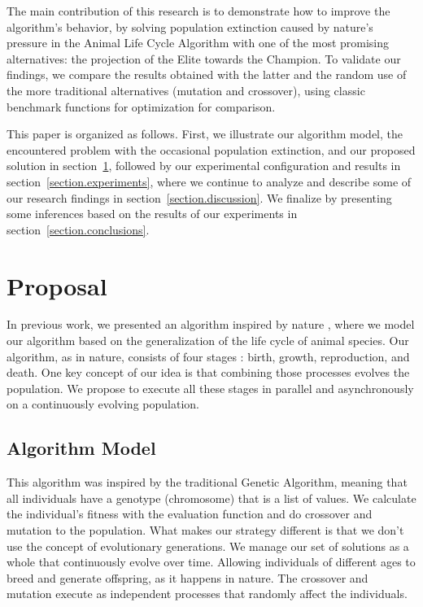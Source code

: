 \documentclass[graybox]{svmult}
\begin{document}
    The main contribution of this research is to demonstrate how to improve the
    algorithm's behavior, by solving population extinction caused by nature's
    pressure in the Animal Life Cycle Algorithm with one of the most promising
    alternatives: the projection of the Elite towards the Champion. To validate
    our findings, we compare the results obtained with the latter and the
    random use of the more traditional alternatives (mutation and crossover),
    using classic benchmark functions for optimization for comparison.

    This paper is organized as follows. First, we 
    illustrate our algorithm model, the encountered problem with the occasional
    population extinction, and our proposed solution in
    section~\ref{section.proposal}, followed by our experimental configuration and
    results in section~\ref{section.experiments}, where we continue to analyze and
    describe some of our research findings in section~\ref{section.discussion}. We
    finalize by presenting some inferences based on the results of our experiments
    in section~\ref{section.conclusions}.

\section{Proposal}
    \label{section.proposal}

    In previous work, we presented an algorithm inspired by nature 
    \cite{Felix-Saul2022}, where we model our algorithm based on
    the generalization of the life cycle of animal species. Our algorithm, as
    in nature, consists of four stages \cite{read1968system}: birth, growth,
    reproduction, and death. One key concept of our idea is that combining
    those processes evolves the population. We propose to execute all these
    stages in parallel and asynchronously on a continuously evolving
    population.


    \subsection{Algorithm Model}
        
        This algorithm was inspired by the traditional Genetic Algorithm,
        meaning that all individuals have a genotype (chromosome) that is a
        list of values. We calculate the individual's fitness with the
        evaluation function and do crossover and mutation to the population.
        What makes our strategy different is that we don't use the concept of
        evolutionary generations. We manage our set of solutions as a whole
        that continuously evolve over time. Allowing individuals of different
        ages to breed and generate offspring, as it happens in nature. The
        crossover and mutation execute as independent processes that randomly
        affect the individuals.
\end{document}

